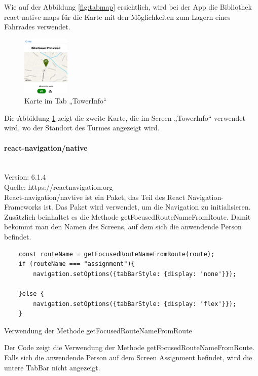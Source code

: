 Wie auf der Abbildung \ref{fig:tabmap} ersichtlich, wird bei der App die Bibliothek react-native-maps für die Karte mit den Möglichkeiten zum Lagern eines Fahrrades verwendet.

\begin{figure}[H]
  \centering
  \includegraphics[width=0.2\textwidth]{images/app-screenshots/smallmap.png}
  \caption{Karte im Tab „TowerInfo“}
  \label{fig:smallmap}
\end{figure}

Die Abbildung \ref{fig:smallmap} zeigt die zweite Karte, die im Screen „TowerInfo“ verwendet wird, wo der Standort des Turmes angezeigt wird.

\bigskip

\paragraph{react-navigation/native}\mbox{}\\
Version: 6.1.4\\
Quelle: https://reactnavigation.org\\
React-navigation/navtive ist ein Paket, das Teil des React Navigation-\Gls{Framework}s ist. Das Paket wird verwendet, um die Navigation zu initialisieren. Zusätzlich beinhaltet es die Methode getFocusedRouteNameFromRoute. Damit bekommt man den Namen des Screens, auf dem sich die anwendende Person befindet.

\begin{listing}[H]
  \begin{verbatim}
    const routeName = getFocusedRouteNameFromRoute(route);
    if (routeName === "assignment"){
        navigation.setOptions({tabBarStyle: {display: 'none'}});
        
    }else {
        navigation.setOptions({tabBarStyle: {display: 'flex'}});
    }
\end{verbatim}
  \caption{Verwendung der Methode getFocusedRouteNameFromRoute}
  \label{lst:getfocusedroutename}
\end{listing}

Der Code zeigt die Verwendung der Methode getFocusedRouteNameFromRoute. Falls sich die anwendende Person auf dem Screen Assignment befindet, wird die untere TabBar nicht angezeigt.


